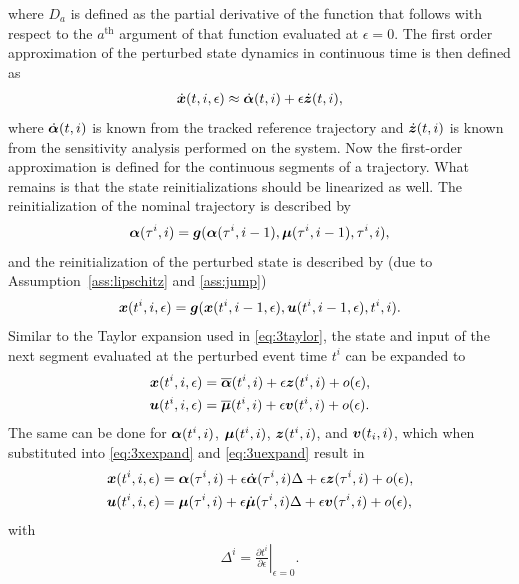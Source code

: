 \documentclass[../DC2017114Bouma.tex]{subfiles}
\begin{document}
where $D_a$ is defined as the partial derivative of the function that follows with respect to the $a^{\text{th}}$ argument of that function evaluated at $\epsilon = 0$. The first order approximation of the perturbed state dynamics in continuous time is then defined as
\begin{align}
\dot{{\boldsymbol{x}}}(t,i,\epsilon) \approx \dot{\boldsymbol{\alpha}}(t,i) + \epsilon\dot{{\boldsymbol{z}}}(t,i),
\end{align}
where $\dot{\boldsymbol{\alpha}}(t,i)$ is known from the tracked reference trajectory and $\dot{{\boldsymbol{z}}}(t,i)$ is known from the sensitivity analysis performed on the system. Now the first-order approximation is defined for the continuous segments of a trajectory. What remains is that the state reinitializations should be linearized as well. The reinitialization of the nominal trajectory is described by
\begin{align}
\boldsymbol{\alpha}(\tau^i,i) = {\boldsymbol{g}}(\boldsymbol{\alpha}(\tau^i,i-1),\boldsymbol{\mu}(\tau^i,i-1),\tau^i,i),\label{eq:3g}
\end{align}
and the reinitialization of the perturbed state is described by (due to Assumption~\ref{ass:lipschitz} and \ref{ass:jump})
\begin{align}
{\boldsymbol{x}}(t^{i},i,\epsilon) = {\boldsymbol{g}}({\boldsymbol{x}}(t^{i},i-1,\epsilon),{\boldsymbol{u}}(t^{i},i-1,\epsilon),t^{i},i).
\end{align}
Similar to the Taylor expansion used in \eqref{eq:3taylor}, the state and input of the next segment evaluated at the perturbed event time $t^{i}$ can be expanded to
\begin{align}
{\boldsymbol{x}}(t^{i},i,\epsilon) &= \overline{\boldsymbol{\alpha}}(t^{i},i) + \epsilon{\boldsymbol{z}}(t^{i},i) + o(\epsilon),\label{eq:3xexpand}\\
{\boldsymbol{u}}(t^{i},i,\epsilon) &= \overline{\boldsymbol{\mu}}(t^{i},i) + \epsilon{\boldsymbol{v}}(t^{i},i) + o(\epsilon).\label{eq:3uexpand}
\end{align}
The same can be done for $\boldsymbol{\alpha}(t^{i},i)$, $\boldsymbol{\mu}(t^{i},i)$, ${\boldsymbol{z}}(t^{i},i)$, and ${\boldsymbol{v}}(t_{i},i)$, which when substituted into \eqref{eq:3xexpand} and \eqref{eq:3uexpand} result in
\begin{align}
{\boldsymbol{x}}(t^{i},i,\epsilon) &= \boldsymbol{\alpha}(\tau^i,i) + \epsilon\dot{\boldsymbol{\alpha}}(\tau^i,i)\Delta + \epsilon{\boldsymbol{z}}(\tau^i,i) + o(\epsilon),\label{eq:3xexpand2}\\
{\boldsymbol{u}}(t^{i},i,\epsilon) &= \boldsymbol{\mu}(\tau^i,i) + \epsilon\dot{\boldsymbol{\mu}}(\tau^i,i)\Delta + \epsilon{\boldsymbol{v}}(\tau^i,i) + o(\epsilon),\label{eq:3uexpand2}
\end{align}
with
\begin{align}
\Delta^{i} = \left.\frac{\partial t^{i}}{\partial\epsilon}\right|_{\epsilon=0}.\label{eq:3Delta}
\end{align}
\end{document}
